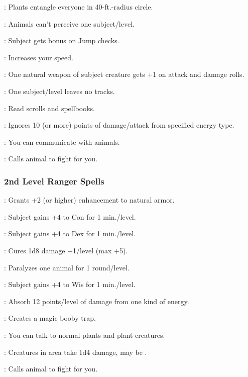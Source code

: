 : Plants entangle everyone in 40-ft.-radius circle.

: Animals can't perceive one subject/level.

: Subject gets bonus on Jump checks.

: Increases your speed.

: One natural weapon of subject creature gets +1 on attack and damage rolls.

: One subject/level leaves no tracks.

: Read scrolls and spellbooks.

: Ignores 10 (or more) points of damage/attack from specified energy type.

: You can communicate with animals.

: Calls animal to fight for you.

\subsubsection{2nd Level Ranger Spells}

: Grants +2 (or higher) enhancement to natural armor.

: Subject gains +4 to Con for 1 min./level.

: Subject gains +4 to Dex for 1 min./level.

: Cures 1d8 damage +1/level (max +5).

: Paralyzes one animal for 1 round/level.

: Subject gains +4 to Wis for 1 min./level.

: Absorb 12 points/level of damage from one kind of energy.

: Creates a magic booby trap.

: You can talk to normal plants and plant creatures.

: Creatures in area take 1d4 damage, may be .

: Calls animal to fight for you.

